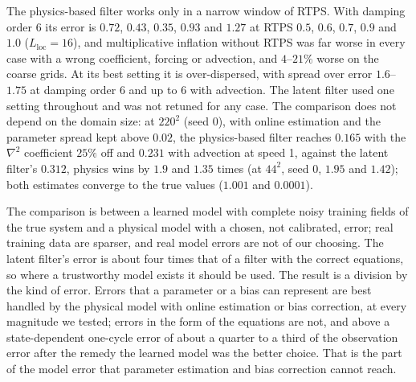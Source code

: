  The physics-based filter works only in a narrow window
of RTPS. With damping order 6 its error is $0.72$, $0.43$, $0.35$, $0.93$ and $1.27$ at
RTPS $0.5$, $0.6$, $0.7$, $0.9$ and $1.0$ ($L_{\mathrm{loc}}=16$), and multiplicative inflation
without RTPS was far worse in every case with a wrong coefficient, forcing
or advection, and $4$--$21\%$ worse on the coarse grids. At its best setting
it is over-dispersed, with spread over error $1.6$--$1.75$ at damping order 6
and up to $6$ with advection. The
latent filter used one setting throughout and was not retuned for any
case. The comparison does not depend on the domain size: at $220^2$ (seed 0), with online estimation
and the parameter spread kept above $0.02$, the physics-based filter reaches $0.165$ with the
$\nabla^2$ coefficient $25\%$ off and $0.231$ with advection at speed 1, against the latent filter's
$0.312$, physics wins by $1.9$ and $1.35$ times (at $44^2$, seed 0, $1.95$ and $1.42$); both estimates
converge to the true values ($1.001$ and $0.0001$).

 The comparison is between a
learned model with complete noisy training fields of the true system and
a physical model with a chosen, not calibrated, error; real training data
are sparser, and real model errors are not of our choosing. The latent
filter's error is about four times that of a filter with the correct
equations, so where a trustworthy model exists it should be used. The
result is a division by the kind of error. Errors that a parameter or a
bias can represent are best handled by the physical model with online
estimation or bias correction, at every magnitude we tested; errors in the form
of the equations are not, and above a state-dependent one-cycle error of
about a quarter to a third of the observation error after the remedy the learned model was the
better choice. That is the part of the model error that parameter
estimation and bias correction cannot reach.

